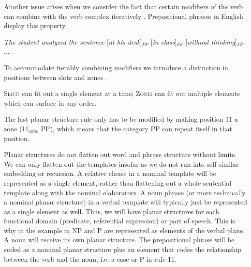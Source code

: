 \documentclass[output=paper,hidelinks]{langscibook}
\begin{document}
Another issue arises when we consider the fact that certain modifiers of the verb can combine with the verb complex iteratively \citep{vater1978possibility, forker2014canonical}. Prepositional phrases in English display this property. 

\ea \label{engPPs}
   \textit{The student analyzed the sentence} [\textit{at his desk}]$_{PP}$ [\textit{in class}]$_{PP}$ [\textit{without thinking}]$_{PP}$ ... \\
\z

To accommodate iterably combining modifiers we introduce a distinction in positions between slots and zones \citep{tallman2018grammar, tallman_constituency_2021}.

\ea 
    \ea \textsc{Slot}: can fit out a single element at a time;
    \ex \textsc{Zone}: can fit out multiple elements which can surface in any order.
    \z
\z 

The last planar structure rule only has to be modified by making position 11 a zone (11$_{zone}$ \rightarrow {} PP), which means that the category PP can repeat itself in that position.

Planar structures do not flatten out word and phrase structure without limits. We can only flatten out the templates insofar as we do not run into self-similar embedding or recursion. A relative clause in a nominal template will be represented as a single element, rather than flattening out a whole sentential template along with the nominal elaborators. A noun phrase (or more technically a nominal planar structure) in a verbal template will typically just be represented as a single element as well. Thus, we will have planar structures for each functional domain (predicate, referential expression) or part of speech. This is why in the example in  NP and P are represented as elements of the verbal plane. A noun will receive its own planar structure. The prepositional phrase will be coded as a nominal planar structure plus an element that codes the relationship between the verb and the noun, i.e. a case or P in rule 11.

\end{document}
